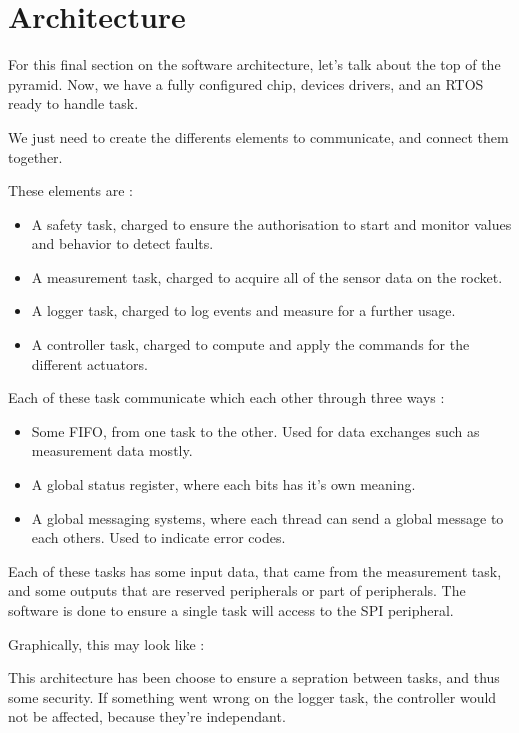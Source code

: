 \section{Architecture}
For this final section on the software architecture, let's talk about the top
of the pyramid. Now, we have a fully configured chip, devices drivers, and an
RTOS\cite{annex:RTOS} ready to handle task.

We just need to create the differents elements to communicate, and connect them
together.

These elements are :

\begin{itemize}[noitemsep]
      \item   A safety task, charged to ensure the authorisation to start and monitor values
            and behavior to detect faults.
      \item   A measurement task, charged to acquire all of the sensor data on the rocket.
      \item   A logger task, charged to log events and measure for a further usage.
      \item   A controller task, charged to compute and apply the commands for the different
            actuators.
\end{itemize}

Each of these task communicate which each other through three ways :

\begin{itemize}[noitemsep]
      \item   Some FIFO, from one task to the other. Used for data exchanges such as
            measurement data mostly.
      \item   A global status register, where each bits has it's own meaning.
      \item   A global messaging systems, where each thread can send a global message to each
            others. Used to indicate error codes.
\end{itemize}

Each of these tasks has some input data, that came from the measurement task,
and some outputs that are reserved peripherals or part of peripherals. The
software is done to ensure a single task will access to the SPI peripheral.

Graphically, this may look like :



This architecture has been choose to ensure a sepration between tasks, and thus
some security. If something went wrong on the logger task, the controller would
not be affected, because they're independant.

